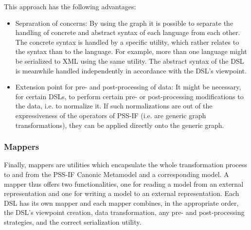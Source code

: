 This approach has the following advantages:

\begin{itemize}
\item Sepraration of concerns: By using the graph it is possible to separate the handling of concrete and abstract syntax of each language from each other. The concrete syntax is handled by a specific utility, which rather relates to the syntax than to the language. For example, more than one language might be serialized to XML using the same utility. The abstract syntax of the DSL is meanwhile handled independently in accordance with the DSL's viewpoint.
\item Extension point for pre- and post-processing of data: It might be necessary, for certain DSLs, to perform certain pre- or post-processing modifications to the data, i.e. to normalize it. If such normalizations are out of the expressiveness of the operators of PSS-IF (i.e. are generic graph transformations), they can be applied directly onto the generic graph.
\end{itemize}

\subsubsection{Mappers}

Finally, mappers are utilities which encapsulate the whole transformation process to and from the PSS-IF Canonic Metamodel and a corresponding model. A mapper thus offers two functionalities, one for reading a model from an external representation and one for writing a model to an external representation. Each DSL has its own mapper and each mapper combines, in the appropriate order, the DSL's viewpoint creation, data transformation, any pre- and post-processing strategies, and the correct serialization utility.